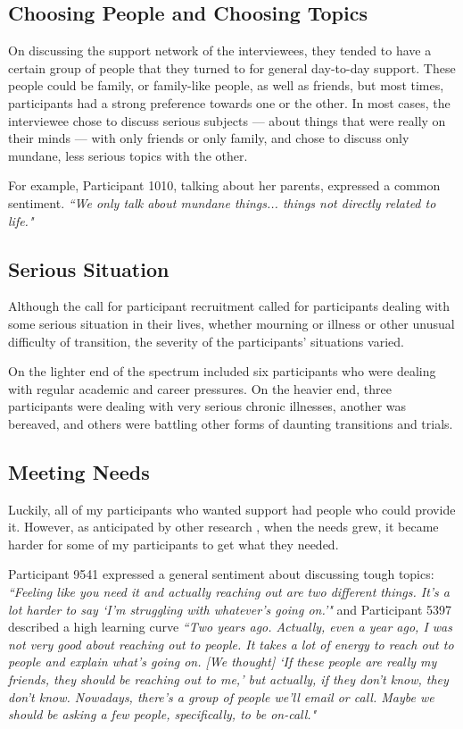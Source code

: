   \subsection{Choosing People and Choosing Topics}
  On discussing the support network of the interviewees,
  they tended to have a certain group of people that they turned to for
  general day-to-day support.
  These people could be family, or family-like people, as well as friends,
  but most times, participants had a strong preference towards one or the other.
  In most cases, the interviewee chose to discuss serious subjects ---
  about things that were really on their minds ---
  with only friends or only family,
  and chose to discuss only mundane, less serious topics with the other.

  For example, Participant 1010, talking about her parents,
  expressed a common sentiment.
  \textit{
  ``We only talk about mundane things...
  things not directly related to life."
  }

  \subsection{Serious Situation}
  Although the call for participant recruitment called for participants
  dealing with some serious situation in their lives,
  whether mourning or illness or other unusual difficulty of transition,
  the severity of the participants' situations varied.

  On the lighter end of the spectrum included six participants who were
  dealing with regular academic and career pressures.
  On the heavier end,
  three participants were dealing with very serious chronic illnesses,
  another was bereaved,
  and others were battling other forms of daunting transitions and trials.

  \subsection{Meeting Needs}
  Luckily, all of my participants who wanted support had people
  who could provide it.
  However, as anticipated by other research \cite{skeels10},
  when the needs grew, it became harder for some of my participants to get
  what they needed.

  Participant 9541 expressed a general sentiment about discussing tough topics:
  \textit{
  ``Feeling like you need it and actually reaching out are two different things.
  It's a lot harder to say `I'm struggling with whatever's going on.'"
  } and Participant 5397 described a high learning curve
  \textit{
  ``Two years ago.
  Actually, even a year ago, I was not very good about reaching out to people.
  It takes a lot of energy to reach out to people and explain what's going on.
  [We thought]
  `If these people are really my friends, they should be reaching out to me,'
  but actually, if they don't know, they don't know.
  Nowadays, there's a group of people we'll email or call.
  Maybe we should be asking a few people, specifically, to be on-call."
  }

